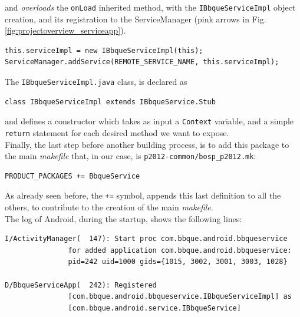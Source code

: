 and \textit{overloads} the \texttt{onLoad} inherited method, with the \texttt{IBbqueServiceImpl} object creation, and its registration to the ServiceManager (pink arrows in Fig. \ref{fig:projectoverview_serviceapp}).
\begin{verbatim}
this.serviceImpl = new IBbqueServiceImpl(this);
ServiceManager.addService(REMOTE_SERVICE_NAME, this.serviceImpl);
\end{verbatim}
The \texttt{IBbqueServiceImpl.java} class, is declared as
\begin{verbatim}
class IBbqueServiceImpl extends IBbqueService.Stub
\end{verbatim}
and defines a constructor which takes as input a \texttt{Context} variable, and a simple \texttt{return} statement for each desired method we want to expose.\\
Finally, the last step before another building process, is to add this package to the main \textit{makefile} that, in our case, is \texttt{p2012-common/bosp\_p2012.mk}:
\begin{verbatim}
PRODUCT_PACKAGES += BbqueService
\end{verbatim}
As already seen before, the \texttt{+=} symbol, appends this last definition to all the others, to contribute to the creation of the main \textit{makefile}.\\
The log of Android, during the startup, shows the following lines:
\begin{verbatim}
I/ActivityManager(  147): Start proc com.bbque.android.bbqueservice
               for added application com.bbque.android.bbqueservice:
               pid=242 uid=1000 gids={1015, 3002, 3001, 3003, 1028}
               
D/BbqueServiceApp(  242): Registered 
               [com.bbque.android.bbqueservice.IBbqueServiceImpl] as
               [com.bbque.android.service.IBbqueService]
\end{verbatim}
